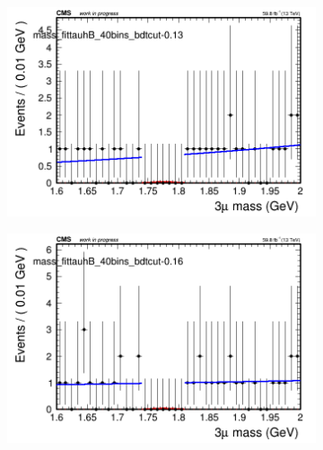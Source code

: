\begin{figure}[H]
\begin{subfigure}{0.2\textwidth}
        \caption{}
    \end{subfigure}
    \begin{subfigure}{0.2\textwidth}
        \includegraphics[width=\textwidth]{unfixed_exp/plots/tauhB/massfit_tauhB_40bins_bdtcut-0.13.png}
        \caption{}
    \end{subfigure}
    \begin{subfigure}{0.2\textwidth}
        \includegraphics[width=\textwidth]{unfixed_exp/plots/tauhB/massfit_tauhB_40bins_bdtcut-0.16.png}
        \caption{}
    \end{subfigure}
    \begin{subfigure}{0.2\textwidth}

\end{subfigure}
\end{figure}
